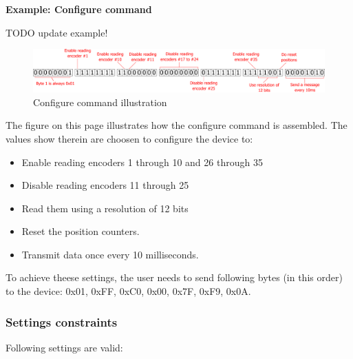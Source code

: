 \documentclass[twoside]{article}
\begin{document}
\textbf{Example: Configure command}

TODO update example!

\begin{figure}[htb]
	\centering
	\includegraphics[width=1.0\textwidth]{figs/bits}
	\caption{Configure command illustration}
	\label{fig:config}
\end{figure}

The figure on this page illustrates how the configure command is assembled. The values show therein are choosen to configure the device to:

\begin{itemize}
\item Enable reading encoders 1 through 10 and 26 through 35
\item Disable reading encoders 11 through 25
\item Read them using a resolution of 12 bits
\item Reset the position counters.
\item Transmit data once every 10 milliseconds.
\end{itemize}

To achieve theese settings, the user needs to send following bytes (in this order) to the device: 0x01, 0xFF, 0xC0, 0x00, 0x7F, 0xF9, 0x0A.

\subsubsection{Settings constraints}

Following settings are valid:
\end{document}
